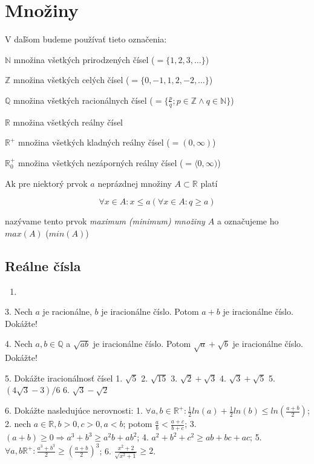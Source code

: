 \chapter{Množiny}%

V daľšom budeme používať tieto označenia:

$\mathbb{N}$ množina všetkých prirodzených čísel ($= \{ 1, 2, 3, \ldots \}$)

$\mathbb{Z}$ množina všetkých celých čísel ($= \{ 0, -1, 1, 2, -2, \ldots \}$)

$\mathbb{Q}$ množina všetkých racionálnych čísel
  ($= \{ \frac{p}{q}; p \in \mathbb{Z} \land q \in \mathbb{N} \}$)

$\mathbb{R}$ množina všetkých reálny čísel

$\mathbb{R}^+$ množina všetkých kladných reálny čísel ($= ( 0, \infty )$)

$\mathbb{R}^+_0$ množina všetkých nezáporných reálny čísel
  ($= \langle 0, \infty )$)

Ak pre niektorý prvok $a$ neprázdnej množiny $A \subset \mathbb{R}$ platí

$$\forall x \in A : x \leq a (\forall x \in A: q \geq a)$$

nazývame tento prvok \textit{maximum (minimum) množiny $A$} a označujeme ho
$max(A)$ ($min(A)$)

\section{Reálne čísla}

\begin{enumerate}
  \item {}
\end{enumerate}
3. Nech $a$ je racionálne, $b$ je iracionálne číslo. Potom $a + b$ je
iracionálne číslo. Dokážte!

4. Nech $a, b \in \mathbb{Q}$ a $\sqrt{ab}$ je iracionálne číslo. Potom
$\sqrt{a} + \sqrt{b}$ je iracionálne číslo. Dokážte!

5. Dokážte iracionálnosť čísel
  1. $\sqrt{5}$
  2. $\sqrt{15}$
  3. $\sqrt{2} + \sqrt{3}$
  4. $\sqrt{3} + \sqrt{5}$
  5. $(4\sqrt{3} - 3) / 6$
  6. $\sqrt{3} - \sqrt{2}$

6. Dokážte nasledujúce nerovnosti:
  1. $\forall a, b \in \mathbb{R}^+: \frac{1}{2} ln(a) + \frac{1}{2} ln(b) \leq ln(\frac{a+b}{2})$;
  2. nech $a \in \mathbb{R}, b > 0, c > 0, a < b$; potom  $\frac{a}{b} < \frac{a + c}{b + c}$;
  3. $(a + b) \geq 0 \Rightarrow a^3 + b^3 \geq a^2 b + ab^2$;
  4. $a^2 + b^2 + c^2 \geq ab + bc + ac$;
  5. $\forall a, b \mathbb{R}^+ : \frac{a^3 + b^3}{2} \geq (\frac{a + b}{2})^3$;
  6. $\frac{x^2 + 2}{\sqrt{x^2 + 1}} \geq 2$.

